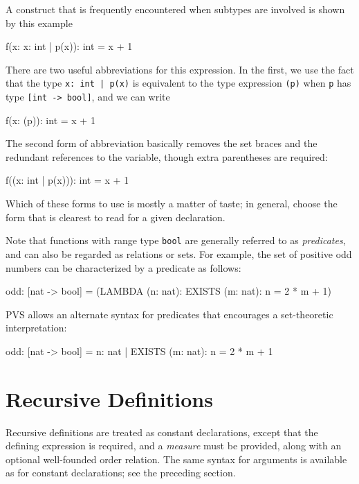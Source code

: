 A construct that is frequently encountered when subtypes are involved is
shown by this example
\begin{pvsex}
  f(x: \setb{}x: int | p(x)\sete): int = x + 1
\end{pvsex}
%
There are two useful abbreviations for this expression.  In the first, we
use the fact that the type \texttt{\setb{}x:\ int | p(x)\sete} is equivalent to
the type expression \texttt{(p)} when \texttt{p} has type \texttt{[int ->
bool]}, and we can write
\begin{pvsex}
  f(x: (p)): int = x + 1
\end{pvsex}
%
The second form of abbreviation basically removes the set braces and the
redundant references to the variable, though extra parentheses are
required:
\begin{pvsex}
  f((x: int | p(x))): int = x + 1
\end{pvsex}
%
Which of these forms to use is mostly a matter of taste; in general,
choose the form that is clearest to read for a given declaration.

Note that functions with range type \texttt{bool} are generally referred
to as \emph{predicates}, and can also be regarded as relations or sets.
For example, the set of positive odd numbers can be characterized by a
predicate as follows:
\begin{pvsex}
  odd: [nat -> bool] = (LAMBDA (n: nat): EXISTS (m: nat): n = 2 * m + 1)
\end{pvsex}
%
PVS allows an alternate syntax for predicates that encourages a
set-theoretic interpretation:
\begin{pvsex}
  odd: [nat -> bool] = \setb{}n: nat | EXISTS (m: nat): n = 2 * m + 1\sete
\end{pvsex}


\section{Recursive Definitions}\label{recursive-definitions}

Recursive definitions are treated as constant declarations, except that
the defining expression is required, and a \emph{measure} must be provided, along with an optional well-founded order
relation. The same syntax for
arguments is available as for constant declarations; see the preceding
section.

